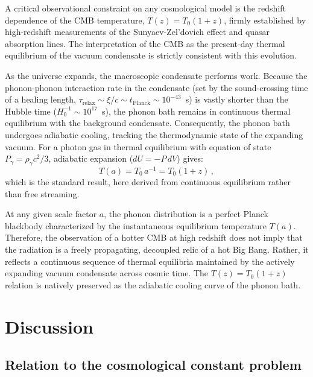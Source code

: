 \documentclass[12pt, a4paper]{article}
\begin{document}
A critical observational constraint on any cosmological model is the redshift dependence of the CMB temperature, $T(z) = T_0(1+z)$, firmly established by high-redshift measurements of the Sunyaev-Zel'dovich effect and quasar absorption lines. The interpretation of the CMB as the present-day thermal equilibrium of the vacuum condensate is strictly consistent with this evolution.

As the universe expands, the macroscopic condensate performs work. Because the phonon-phonon interaction rate in the condensate (set by the sound-crossing time of a healing length, $\tau_{\mathrm{relax}} \sim \xi/c \sim t_{\mathrm{Planck}} \sim 10^{-43}$~s) is vastly shorter than the Hubble time ($H_0^{-1} \sim 10^{17}$~s), the phonon bath remains in continuous thermal equilibrium with the background condensate. Consequently, the phonon bath undergoes adiabatic cooling, tracking the thermodynamic state of the expanding vacuum. For a photon gas in thermal equilibrium with equation of state $P_\gamma = \rho_\gamma c^2/3$, adiabatic expansion ($dU = -P\,dV$) gives:
\begin{equation}
    T(a) = T_0\,a^{-1} = T_0(1+z)\,,
\label{eq:T_adiabatic}
\end{equation}
which is the standard result, here derived from continuous equilibrium rather than free streaming.

At any given scale factor $a$, the phonon distribution is a perfect Planck blackbody characterized by the instantaneous equilibrium temperature $T(a)$. Therefore, the observation of a hotter CMB at high redshift does not imply that the radiation is a freely propagating, decoupled relic of a hot Big Bang. Rather, it reflects a continuous sequence of thermal equilibria maintained by the actively expanding vacuum condensate across cosmic time. The $T(z) = T_0(1+z)$ relation is natively preserved as the adiabatic cooling curve of the phonon bath.

\section{Discussion}
\label{sec:discussion}

\subsection{Relation to the cosmological constant problem}
\end{document}
